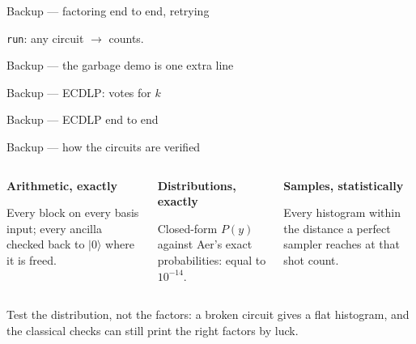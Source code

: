 \documentclass[aspectratio=169,11pt]{beamer}
\newcommand{\blocktitle}[1]{{\bfseries #1}\par\vskip1mm}
\newcommand{\code}[2][]{}
\begin{document}
\begin{frame}[fragile]{Backup --- factoring end to end, retrying}
  \code[basicstyle=\ttfamily\footnotesize]{find_factor.py}
  \vskip2mm
  \texttt{run}: any circuit $\to$ counts.
\end{frame}

\begin{frame}[fragile]{Backup --- the garbage demo is one extra line}
  \code[basicstyle=\ttfamily\footnotesize]{garbage.py}
\end{frame}

\begin{frame}[fragile]{Backup --- ECDLP: votes for $k$}
  \code[basicstyle=\ttfamily\footnotesize]{ecdlp_post.py}
\end{frame}

\begin{frame}[fragile]{Backup --- ECDLP end to end}
  \code[basicstyle=\ttfamily\footnotesize]{ecdlp_run.py}
\end{frame}

\begin{frame}{Backup --- how the circuits are verified}
  \begin{columns}[T]
    \begin{column}{0.31\textwidth}
      \begin{greyblock}[fontupper=\small]
        \blocktitle{Arithmetic, exactly}
        Every block on every basis input; every ancilla checked back to $|0\rangle$ where it is freed.
      \end{greyblock}
    \end{column}
    \begin{column}{0.31\textwidth}
      \begin{greyblock}[fontupper=\small]
        \blocktitle{Distributions, exactly}
        Closed-form $P(y)$ against Aer's exact probabilities: equal to $10^{-14}$.
      \end{greyblock}
    \end{column}
    \begin{column}{0.31\textwidth}
      \begin{greyblock}[fontupper=\small]
        \blocktitle{Samples, statistically}
        Every histogram within the distance a perfect sampler reaches at that shot count.
      \end{greyblock}
    \end{column}
  \end{columns}
  \vskip3mm
  \begin{takeaway}Test the distribution, not the factors: a broken circuit gives a flat histogram, and the classical checks can still print the right factors by luck.\end{takeaway}
\end{frame}
\end{document}
